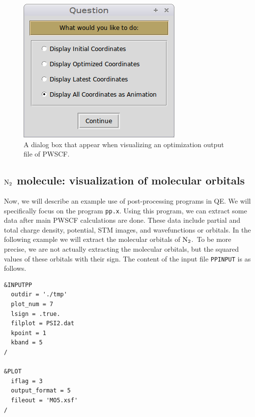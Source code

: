 \documentclass[12pt,english]{paper}
\begin{document}
\noindent \begin{center}
\begin{figure}[H]
\noindent \begin{centering}
\includegraphics[scale=0.5]{images/DispCoordAsAnim}
\par\end{centering}

\caption{A dialog box that appear when visualizing an optimization output file
of PWSCF.\label{fig:DispCoordAsAnim}}
\end{figure}

\par\end{center}


\subsection{$\ce{N2}$ molecule: visualization of molecular orbitals}

Now, we will describe an example use of post-processing programs in
QE. We will specifically focus on the program \texttt{pp.x}. Using
this program, we can extract some data after main PWSCF calculations
are done. These data include partial and total charge density, potential,
STM images, and wavefunctions or orbitals. In the following example
we will extract the molecular orbitals of $\ce{N2}$.~To be more
precise, we are not actually extracting the molecular orbitals, but
the squared values of these orbitals with their sign. The content
of the input file \texttt{PPINPUT} is as follows.

\begin{lstlisting}
&INPUTPP
  outdir = './tmp'
  plot_num = 7
  lsign = .true.
  filplot = PSI2.dat
  kpoint = 1
  kband = 5
/

&PLOT
  iflag = 3
  output_format = 5
  fileout = 'MO5.xsf'
/
\end{lstlisting}
\end{document}
